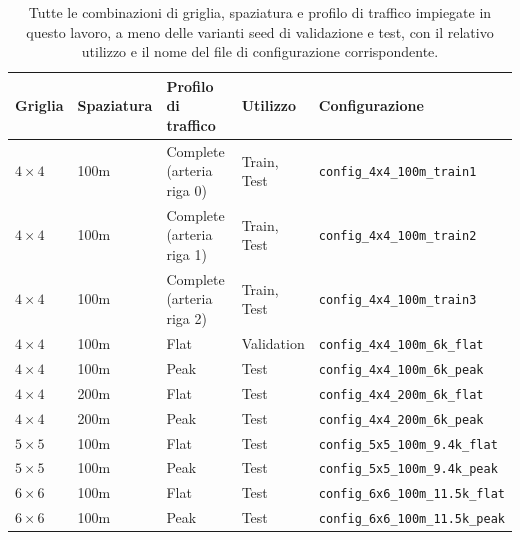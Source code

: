 \begin{table}[htbp]
  \centering
  \footnotesize
  \begin{tabular}{@{}lllll@{}}
    \toprule
    Griglia    & Spaziatura & Profilo di traffico       & Utilizzo    & Configurazione                          \\
    \midrule
    $4\times4$ & 100m       & Complete (arteria riga 0) & Train, Test & \texttt{config\_4x4\_100m\_train1}      \\
    $4\times4$ & 100m       & Complete (arteria riga 1) & Train, Test & \texttt{config\_4x4\_100m\_train2}      \\
    $4\times4$ & 100m       & Complete (arteria riga 2) & Train, Test & \texttt{config\_4x4\_100m\_train3}      \\
    $4\times4$ & 100m       & Flat                      & Validation  & \texttt{config\_4x4\_100m\_6k\_flat}    \\
    $4\times4$ & 100m       & Peak                      & Test        & \texttt{config\_4x4\_100m\_6k\_peak}    \\
    $4\times4$ & 200m       & Flat                      & Test        & \texttt{config\_4x4\_200m\_6k\_flat}    \\
    $4\times4$ & 200m       & Peak                      & Test        & \texttt{config\_4x4\_200m\_6k\_peak}    \\
    $5\times5$ & 100m       & Flat                      & Test        & \texttt{config\_5x5\_100m\_9.4k\_flat}  \\
    $5\times5$ & 100m       & Peak                      & Test        & \texttt{config\_5x5\_100m\_9.4k\_peak}  \\
    $6\times6$ & 100m       & Flat                      & Test        & \texttt{config\_6x6\_100m\_11.5k\_flat} \\
    $6\times6$ & 100m       & Peak                      & Test        & \texttt{config\_6x6\_100m\_11.5k\_peak} \\
    \bottomrule
  \end{tabular}
  \caption{Tutte le combinazioni di griglia, spaziatura e profilo di traffico impiegate in questo lavoro, a meno delle varianti seed di validazione e test, con il relativo utilizzo e il nome del file di configurazione corrispondente.}
  \label{tab:split}
\end{table}

